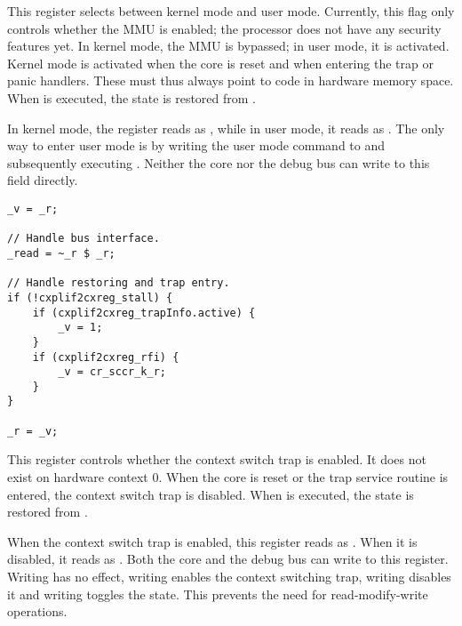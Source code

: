 This register selects between kernel mode and user mode. Currently, this flag 
only controls whether the MMU is enabled; the \rvex{} processor does not have 
any security features yet. In kernel mode, the MMU is bypassed; in user mode, it 
is activated. Kernel mode is activated when the core is reset and when entering 
the trap or panic handlers. These must thus always point to code in hardware 
memory space. When  is executed, the state is restored from
.

In kernel mode, the register reads as , while in user mode, it reads as 
. The only way to enter user mode is by writing the user mode command 
to  and subsequently executing . Neither the core nor the 
debug bus can write to this field directly.

\declaration{}
\implementation{}
\begin{lstlisting}
_v = _r;

// Handle bus interface.
_read = ~_r $ _r;

// Handle restoring and trap entry.
if (!cxplif2cxreg_stall) {
    if (cxplif2cxreg_trapInfo.active) {
        _v = 1;
    }
    if (cxplif2cxreg_rfi) {
        _v = cr_sccr_k_r;
    }
}

_r = _v;
\end{lstlisting}

This register controls whether the context switch trap is enabled. It does not 
exist on hardware context 0. When the core is reset or the trap service routine 
is entered, the context switch trap is disabled. When  is executed, 
the state is restored from .

When the context switch trap is enabled, this register reads as . When 
it is disabled, it reads as . Both the core and the debug bus can write 
to this register. Writing  has no effect, writing  enables the 
context switching trap, writing  disables it and writing  
toggles the state. This prevents the need for read-modify-write operations.

